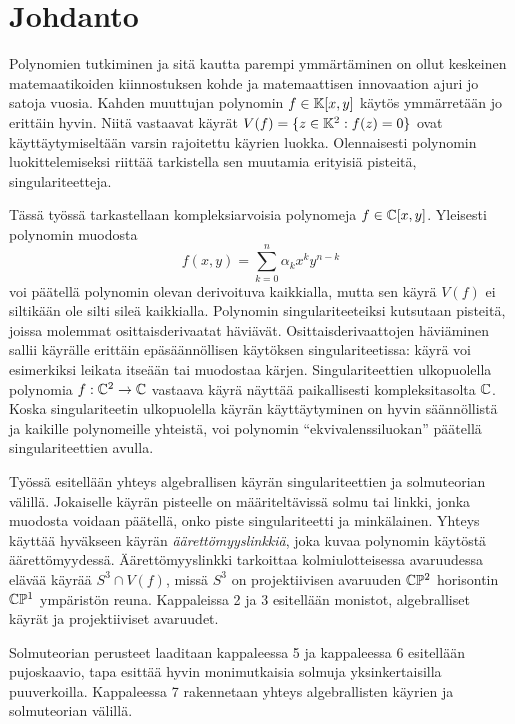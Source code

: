 \section{Johdanto}
Polynomien tutkiminen ja sitä kautta parempi ymmärtäminen on ollut keskeinen matemaatikoiden kiinnostuksen kohde ja matemaattisen innovaation ajuri jo satoja vuosia. Kahden muuttujan polynomin $f\in\mathbb{K}[x,y]$ käytös ymmärretään jo erittäin hyvin. Niitä vastaavat käyrät $V(f)=\{z\in\mathbb{K}^2:f(z)=0\}$ ovat käyttäytymiseltään varsin rajoitettu käyrien luokka. Olennaisesti polynomin luokittelemiseksi riittää tarkistella sen muutamia erityisiä pisteitä, singulariteetteja.

Tässä työssä tarkastellaan kompleksiarvoisia polynomeja $f\in\mathbb{C}[x,y]$. Yleisesti polynomin muodosta
\begin{equation*}
    f(x,y)=\sum_{k=0}^{n}\alpha_kx^ky^{n-k}
\end{equation*}
voi päätellä polynomin olevan derivoituva kaikkialla, mutta sen käyrä $V(f)$ ei siltikään ole silti sileä kaikkialla. Polynomin singulariteeteiksi kutsutaan pisteitä, joissa molemmat osittaisderivaatat häviävät. Osittaisderivaattojen häviäminen sallii käyrälle erittäin epäsäännöllisen käytöksen singulariteetissa: käyrä voi esimerkiksi leikata itseään tai muodostaa kärjen. Singulariteettien ulkopuolella polynomia $f:\mathbb{C}^2\to\mathbb{C}$ vastaava käyrä näyttää paikallisesti kompleksitasolta $\mathbb{C}$. Koska singulariteetin ulkopuolella käyrän käyttäytyminen on hyvin säännöllistä ja kaikille polynomeille yhteistä, voi polynomin ``ekvivalenssiluokan'' päätellä singulariteettien avulla.

Työssä esitellään yhteys algebrallisen käyrän singulariteettien ja solmuteorian välillä. Jokaiselle käyrän pisteelle on määriteltävissä solmu tai linkki, jonka muodosta voidaan päätellä, onko piste singulariteetti ja minkälainen. Yhteys käyttää hyväkseen käyrän \emph{äärettömyyslinkkiä}, joka kuvaa polynomin käytöstä äärettömyydessä. Äärettömyyslinkki tarkoittaa kolmiulotteisessa avaruudessa elävää käyrää $S^3\cap V(f)$, missä $S^3$ on projektiivisen avaruuden $\mathbb{C}\mathbb{P}^2$ horisontin $\mathbb{C}\mathbb{P}^1$ ympäristön reuna. Kappaleissa 2 ja 3 esitellään monistot, algebralliset käyrät ja projektiiviset avaruudet.

Solmuteorian perusteet laaditaan kappaleessa 5 ja kappaleessa 6 esitellään pujoskaavio, tapa esittää hyvin monimutkaisia solmuja yksinkertaisilla puuverkoilla. Kappaleessa 7 rakennetaan yhteys algebrallisten käyrien ja solmuteorian välillä. 

